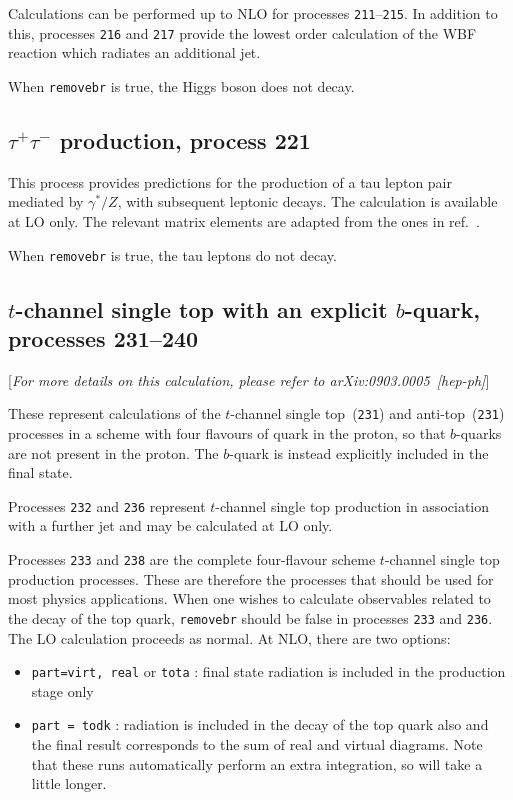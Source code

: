 \documentclass[12pt]{article}
\begin{document}
Calculations can be performed up to NLO for processes {\tt 211}--{\tt 215}.
In addition to this, processes {\tt 216} and {\tt 217} provide the lowest
order calculation of the WBF reaction which radiates an additional jet. 

When {\tt removebr} is true, the Higgs boson does not decay.

\subsection{$\tau^+\tau^-$ production, process 221}
\label{subsec:tautau}

This process provides predictions for the production of a tau lepton
pair mediated by $\gamma^*/Z$, with subsequent leptonic decays. The calculation is available at LO
only. The relevant matrix elements are adapted from the ones in
ref.~\cite{Kleiss:1988xr}.

When {\tt removebr} is true, the tau leptons do not decay.

\subsection{$t$-channel single top with an explicit $b$-quark, processes 231--240}
\label{subsec:stopb}

\begin{center}
[{\it For more details on this calculation, please refer to arXiv:0903.0005~[hep-ph]}]
\end{center}

These represent calculations of the $t$-channel single top~({\tt 231}) and anti-top~({\tt 231})
processes in a scheme with four flavours of quark in the proton, so that $b$-quarks are not present in the proton.
The $b$-quark is instead explicitly included in the final state.

Processes {\tt 232} and {\tt 236} represent $t$-channel single top production in association
with a further jet and may be calculated at LO only.

Processes {\tt 233} and {\tt 238} are the complete four-flavour scheme $t$-channel single top production processes.
These are therefore the processes that should be used for most physics applications.
When one wishes to calculate observables related to the decay of the top
quark, {\tt removebr} should be false in processes {\tt 233} and {\tt 236}.
The LO calculation proceeds as normal. At NLO, there are two options:
\begin{itemize}
\item {\tt part=virt, real} or {\tt tota} : final state radiation is included
in the production stage only
\item {\tt part = todk} : radiation is included in the decay of the top
quark also and the final result corresponds to the sum of real and virtual
diagrams. 
Note that these runs automatically perform an extra integration, so
will take a little longer.
\end{itemize}
\end{document}
